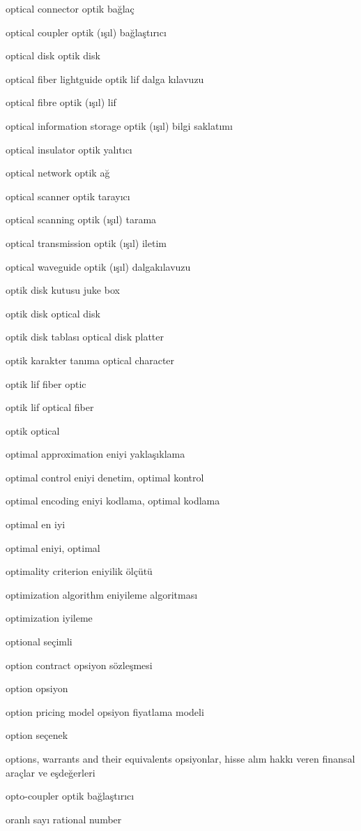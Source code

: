 \documentclass[12pt,fleqn]{article}\usepackage{../../common}
\begin{document}
optical connector optik bağlaç

optical coupler optik (ışıl) bağlaştırıcı

optical disk optik disk

optical fiber lightguide optik lif dalga kılavuzu

optical fibre optik (ışıl) lif

optical information storage optik (ışıl) bilgi saklatımı

optical insulator optik yalıtıcı

optical network optik ağ

optical scanner optik tarayıcı

optical scanning optik (ışıl) tarama

optical transmission optik (ışıl) iletim

optical waveguide optik (ışıl) dalgakılavuzu

optik disk kutusu juke box

optik disk optical disk

optik disk tablası optical disk platter

optik karakter tanıma optical character

optik lif fiber optic

optik lif optical fiber

optik optical

optimal approximation eniyi yaklaşıklama

optimal control eniyi denetim, optimal kontrol

optimal encoding eniyi kodlama, optimal kodlama

optimal en iyi

optimal eniyi, optimal

optimality criterion eniyilik ölçütü

optimization algorithm eniyileme algoritması

optimization iyileme

optional seçimli

option contract opsiyon sözleşmesi

option opsiyon

option pricing model opsiyon fiyatlama modeli

option seçenek

options, warrants and their equivalents opsiyonlar, hisse alım hakkı veren finansal araçlar ve eşdeğerleri

opto-coupler optik bağlaştırıcı

oranlı sayı rational number
\end{document}
